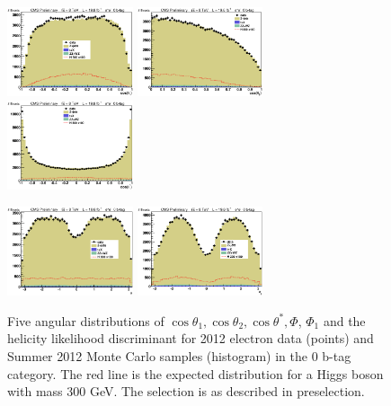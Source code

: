 \begin{figure}[thb!]
\centerline{
\includegraphics[width=0.33\textwidth]{presentation/defense/images/preselection/0/el/costheta1.eps}
\includegraphics[width=0.33\textwidth]{presentation/defense/images/preselection/0/el/costheta2.eps}
\includegraphics[width=0.33\textwidth]{presentation/defense/images/preselection/0/el/costhetast.eps}
}
\centerline{
\includegraphics[width=0.33\textwidth]{presentation/defense/images/preselection/0/el/phi.eps}
\includegraphics[width=0.33\textwidth]{presentation/defense/images/preselection/0/el/phi1.eps}
}
\caption{
Five angular distributions of $\cos\theta_1, \cos\theta_2, \cos\theta^*, \Phi$, $\Phi_1$ and the helicity likelihood discriminant for 2012 electron data (points) and Summer 2012 Monte Carlo samples (histogram) in the 0 b-tag category.  The red line is the expected distribution for a Higgs boson with mass 300 GeV.  The selection is as described in preselection.
\label{helicityDistDataMCE0}}
\end{figure}
